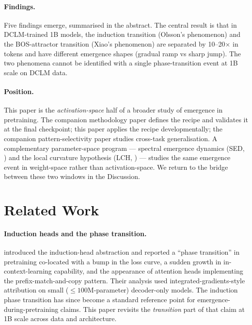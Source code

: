 \documentclass[11pt]{article}
\begin{document}
\paragraph{Findings.} Five findings emerge, summarised in the abstract.
The central result is that in DCLM-trained 1B models, the induction
transition (Olsson's phenomenon) and the BOS-attractor transition
(Xiao's phenomenon) are separated by 10--20$\times$ in tokens and have
different emergence shapes (gradual ramp vs sharp jump). The two
phenomena cannot be identified with a single phase-transition event at
1B scale on DCLM data.

\paragraph{Position.} This paper is the \emph{activation-space} half of a
broader study of emergence in pretraining. The companion methodology paper
\citep{paper1_methodology} defines the recipe and validates it at the
final checkpoint; this paper applies the recipe developmentally; the
companion pattern-selectivity paper \citep{paper3_circuits} studies
cross-task generalisation. A complementary parameter-space program ---
spectral emergence dynamics (SED, \citealp{xu2026sed}) and the local
curvature hypothesis (LCH, \citealp{xu2026lch}) --- studies the same
emergence event in weight-space rather than activation-space. We return to
the bridge between these two windows in the Discussion.

\section{Related Work}

\paragraph{Induction heads and the phase transition.}
\citet{olsson2022} introduced the induction-head abstraction and reported a
``phase transition'' in pretraining co-located with a bump in the loss
curve, a sudden growth in in-context-learning capability, and the
appearance of attention heads implementing the prefix-match-and-copy
pattern. Their analysis used integrated-gradients-style attribution on
small ($\le\!\!100\mathrm{M}$-parameter) decoder-only models. The induction
phase transition has since become a standard reference point for
emergence-during-pretraining claims. This paper revisits the
\emph{transition} part of that claim at 1B scale across data and
architecture.
\end{document}
